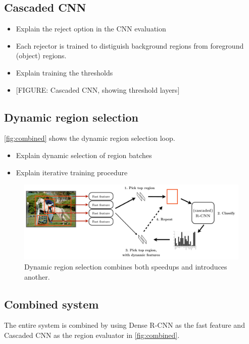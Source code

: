 \subsection{Cascaded CNN}\label{cascaded-cnn}

\begin{itemize}
\itemsep1pt\parskip0pt
\item
  Explain the reject option in the CNN evaluation
\item
  Each rejector is trained to distiguish background regions from foreground (object) regions.
\item
  Explain training the thresholds
\item
  {[}FIGURE: Cascaded CNN, showing threshold layers{]}
\end{itemize}

\subsection{Dynamic region selection}\label{dynamic-region-selection}

\autoref{fig:combined} shows the dynamic region selection loop.

\begin{itemize}
\itemsep1pt\parskip0pt
\item
  Explain dynamic selection of region batches
\item
  Explain iterative training procedure
\end{itemize}

\begin{figure}[h!]
\begin{center}
\includegraphics[width=0.98\columnwidth]{figures/combined.pdf}
\caption{
Dynamic region selection combines both speedups and introduces another.
}\label{fig:combined}
\end{center}
\end{figure}

\subsection{Combined system}\label{combined-system}

The entire system is combined by using Dense R-CNN as the fast feature and Cascaded CNN as the region evaluator in \autoref{fig:combined}.
